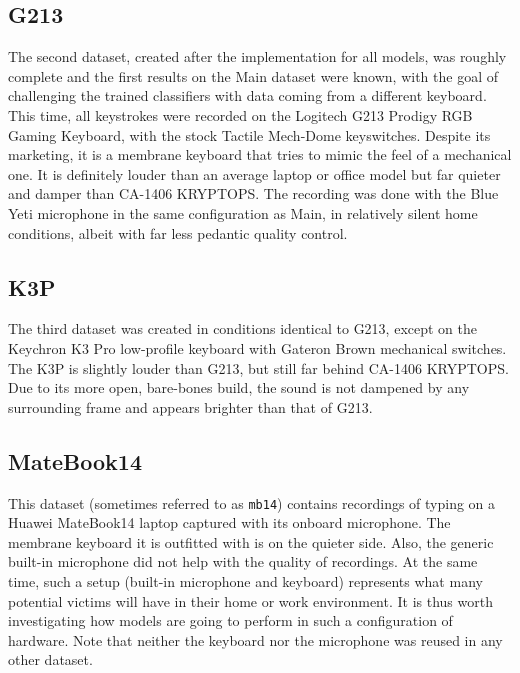 \documentclass[../main.tex]{subfiles}
\begin{document}
\subsection{G213}
\label{sec:dataset_g213}
The second dataset, created after the implementation for all models, was roughly complete
and the first results on the Main dataset were known, with the goal of challenging the trained
classifiers with data coming from a different keyboard.
This time, all keystrokes were recorded on the Logitech G213 Prodigy RGB Gaming Keyboard,
with the stock Tactile Mech-Dome keyswitches. Despite its marketing, it is a membrane
keyboard that tries to mimic the feel of a mechanical one. It is definitely louder than
an average laptop or office model but far quieter and damper than CA-1406 KRYPTOPS.
The recording was done with the Blue Yeti microphone in the same configuration as Main,
in relatively silent home conditions, albeit with far less pedantic quality control.

\subsection{K3P}
\label{sec:dataset_k3p}
The third dataset was created in conditions identical to G213, except on the Keychron K3 Pro low-profile keyboard with Gateron Brown mechanical switches. The K3P is slightly louder than G213, but still far behind CA-1406 KRYPTOPS. Due to its more open, bare-bones build, the sound is not dampened by any surrounding frame and appears brighter than that of G213. 

\subsection{MateBook14}
\label{sec:dataset_matebook14}
This dataset (sometimes referred to as \verb|mb14|) contains recordings of typing on a Huawei MateBook14 laptop captured with its onboard microphone. The membrane keyboard it is outfitted with is on the quieter side. Also, the generic built-in microphone did not help with the quality of recordings. At the same time, such a setup (built-in microphone and keyboard) represents what many potential victims will have in their home or work environment. It is thus worth investigating how models are going to perform in such a configuration of hardware. Note that neither the keyboard nor the microphone was reused in any other dataset.

\end{document}
